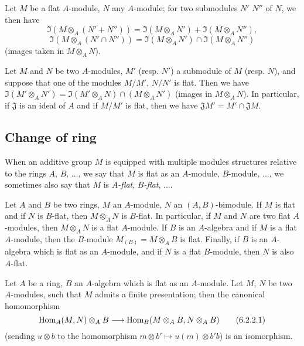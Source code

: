 \begin{env}[6.1.3]
\label{0.6.1.3}
Let $M$ be a flat $A$-module, $N$ any $A$-module; for two submodules $N'$ $N''$ of $N$, we then have
\[
  \Im(M\otimes_A(N'+N''))=\Im(M\otimes_A N')+\Im(M\otimes_A N''),
\]
\[
  \Im(M\otimes_A(N'\cap N''))=\Im(M\otimes_A N')\cap\Im(M\otimes_A N'')
\]
(images taken in $M\otimes_A N$).
\end{env}

\begin{env}[6.1.4]
\label{0.6.1.4}
Let $M$ and $N$ be two $A$-modules, $M'$ (resp. $N'$) a submodule of $M$ (resp. $N$), and suppose that one of the modules $M/M'$, $N/N'$ is flat.
Then we have $\Im(M'\otimes_A N')=\Im(M'\otimes_A N)\cap(M\otimes_A N')$ (images in $M\otimes_A N$).
In particular, if $\mathfrak{J}$ is an ideal of $A$ and if $M/M'$ is flat, then we have $\mathfrak{J}M'=M'\cap\mathfrak{J}M$.
\end{env}

\subsection{Change of ring}
\label{subsection:0.6.2}

When an additive group $M$ is equipped with multiple modules structures relative
to the rings $A$, $B$, ..., we say that $M$ is flat as an $A$-module,
$B$-module, ..., we sometimes also say that $M$ is \emph{$A$-flat},
\emph{$B$-flat}, ....

\begin{env}[6.2.1]
\label{0.6.2.1}
Let $A$ and $B$ be two rings, $M$ an $A$-module, $N$ an $(A,B)$-bimodule.
If $M$ is flat and if $N$ is $B$-flat, then $M\otimes_A N$ is $B$-flat.
In particular, if $M$ and $N$ are two flat $A$-modules, then $M\otimes_A N$ is a flat $A$-module.
If $B$ is an $A$-algebra and if $M$ is
a flat $A$-module, then the $B$-module $M_{(B)}=M\otimes_A B$ is flat.
Finally, if $B$ is an $A$-algebra which is flat as an $A$-module, and if $N$ is a flat $B$-module, then $N$ is also $A$-flat.
\end{env}

\begin{env}[6.2.2]
\label{0.6.2.2}
Let $A$ be a ring, $B$ an $A$-algebra which is flat as an $A$-module. Let $M$,
$N$ be two $A$-modules, such that $M$ admits a finite presentation; then the
canonical homomorphism
\[
  \Hom_A(M,N)\otimes_A B\to\Hom_B(M\otimes_A B,N\otimes_A B)
  \tag{6.2.2.1}
\]
(sending $u\otimes b$ to the homomorphism $m\otimes b'\mapsto u(m)\otimes b' b$) is an isomorphism.
\end{env}

